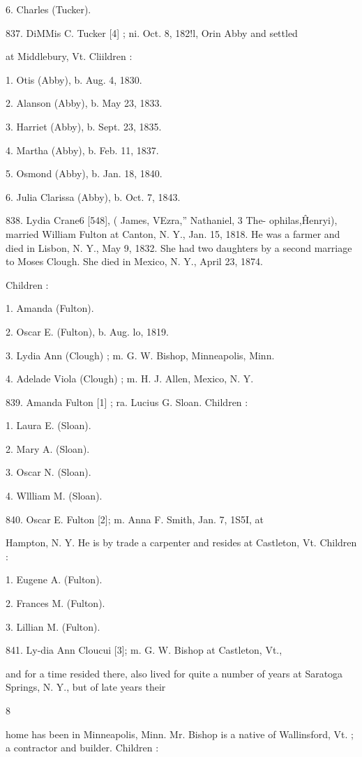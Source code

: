 \documentclass{book}
\begin{document}
6. Charles (Tucker). 

837. DiMMis C. Tucker [4] ; ni. Oct. 8, 182!l, Orin Abby and settled 

at Middlebury, Vt. Cliildren : 

1. Otis (Abby), b. Aug. 4, 1830. 

2. Alanson (Abby), b. May 23, 1833. 

3. Harriet (Abby), b. Sept. 23, 1835. 

4. Martha (Abby), b. Feb. 11, 1837. 

5. Osmond (Abby), b. Jan. 18, 1840. 

6. Julia Clarissa (Abby), b. Oct. 7, 1843. 

838. Lydia Crane6 [548], ( James, VEzra,'' Nathaniel, 3 The- 
ophilas,\^ Henryi), married William Fulton at Canton, N. Y., 
Jan. 15, 1818. He was a farmer and died in Lisbon, N. Y., 
May 9, 1832. She had two daughters by a second marriage to 
Moses Clough. She died in Mexico, N. Y., April 23, 1874. 

Children : 

1. Amanda (Fulton). 

2. Oscar E. (Fulton), b. Aug. lo, 1819. 

3. Lydia Ann (Clough) ; m. G. W. Bishop, Minneapolis, Minn. 

4. Adelade Viola (Clough) ; m. H. J. Allen, Mexico, N. Y. 

839. Amanda Fulton [1] ; ra. Lucius G. Sloan. Children : 

1. Laura E. (Sloan). 

2. Mary A. (Sloan). 

3. Oscar N. (Sloan). 

4. Wllliam M. (Sloan). 

840. Oscar E. Fulton [2]; m. Anna F. Smith, Jan. 7, 1S5I, at 

Hampton, N. Y. He is by trade a carpenter and resides at 
Castleton, Vt. Children : 

1. Eugene A. (Fulton). 

2. Frances M. (Fulton). 

3. Lillian M. (Fulton). 

841. Ly-dia Ann Cloucui [3]; m. G. W. Bishop at Castleton, Vt., 

and for a time resided there, also lived for quite a number of 
years at Saratoga Springs, N. Y., but of late years their 

8 




home has been in Minneapolis, Minn. Mr. Bishop is a native 
of Wallinsford, Vt. ; a contractor and builder. Children : 
\end{document}
